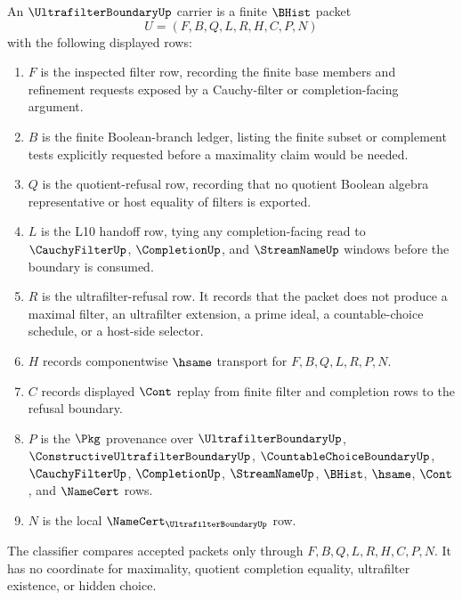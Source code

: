 \begin{definition}
\label{def:ultrafilter-boundary-carrier}
An $\UltrafilterBoundaryUp$ carrier is a finite $\BHist$ packet
$$
U=(F,B,Q,L,R,H,C,P,N)
$$
with the following displayed rows:
\begin{enumerate}
\item $F$ is the inspected filter row, recording the finite base members and refinement requests exposed by a Cauchy-filter or completion-facing argument.
\item $B$ is the finite Boolean-branch ledger, listing the finite subset or complement tests explicitly requested before a maximality claim would be needed.
\item $Q$ is the quotient-refusal row, recording that no quotient Boolean algebra representative or host equality of filters is exported.
\item $L$ is the L10 handoff row, tying any completion-facing read to $\CauchyFilterUp$, $\CompletionUp$, and $\StreamNameUp$ windows before the boundary is consumed.
\item $R$ is the ultrafilter-refusal row. It records that the packet does not produce a maximal filter, an ultrafilter extension, a prime ideal, a countable-choice schedule, or a host-side selector.
\item $H$ records componentwise $\hsame$ transport for $F,B,Q,L,R,P,N$.
\item $C$ records displayed $\Cont$ replay from finite filter and completion rows to the refusal boundary.
\item $P$ is the $\Pkg$ provenance over $\UltrafilterBoundaryUp$, $\ConstructiveUltrafilterBoundaryUp$, $\CountableChoiceBoundaryUp$, $\CauchyFilterUp$, $\CompletionUp$, $\StreamNameUp$, $\BHist$, $\hsame$, $\Cont$, and $\NameCert$ rows.
\item $N$ is the local $\NameCert_{\UltrafilterBoundaryUp}$ row.
\end{enumerate}
The classifier compares accepted packets only through $F,B,Q,L,R,H,C,P,N$. It has no coordinate for maximality, quotient completion equality, ultrafilter existence, or hidden choice.
\end{definition}

